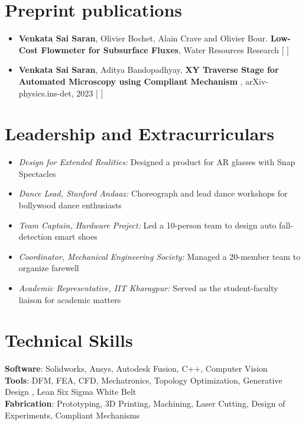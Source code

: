 \documentclass[a4paper,11pt]{article}
\begin{document}
\section{Preprint publications}
    \begin{itemize}[itemsep=-1pt, parsep=3pt]
        \item\small \textbf{Venkata Sai Saran}, Olivier Bochet, Alain Crave and Olivier Bour. \textbf{Low-Cost Flowmeter for Subsurface Fluxes}, Water Resources Research [ \href{https://drive.google.com/file/d/1GCLjv1otmMi0FopOgjguIMfjyTxVNbEb/view?usp=share_link}{\color{blue}{Draft}}]

        \item \textbf{Venkata Sai Saran}, Aditya Bandopadhyay, \textbf{XY Traverse Stage for Automated Microscopy using Compliant Mechanism }, arXiv-physics.ins-det, 2023 [ \href{http://arxiv.org/abs/2311.11022}{\color{blue}{Preprint}}]
    \end{itemize}
    
\section{Leadership and Extracurriculars}
    \begin{itemize}[itemsep=-5pt, parsep=3pt]
        \item \textit{Design for Extended Realities:} Designed a product for AR glasses with Snap Spectacles
        
        \item \textit{Dance Lead, Stanford Andaaz:} Choreograph and lead dance workshops for bollywood dance enthusiasts

        \item \textit{Team Captain, Hardware Project:} Led a 10-person team to design auto fall-detection smart shoes

        \item \textit{Coordinator, Mechanical Engineering Society:} Managed a 20-member team to organize farewell

        \item \textit{Academic Representative, IIT Kharagpur:} Served as the student-faculty liaison for academic matters
    \end{itemize}
 \vspace{-16pt}
\section{Technical Skills}
 \begin{itemize}[leftmargin=0.15in, label={}]
    \small{\item{
     \textbf{Software}{: Solidworks, Ansys, Autodesk Fusion, C++, Computer Vision}   \\ \textbf{Tools}{: DFM, FEA, CFD, Mechatronics, Topology Optimization, Generative Design , Lean Six Sigma White Belt} \\
     \textbf{Fabrication}{: Prototyping, 3D Printing, Machining, Laser Cutting, Design of Experiments, Compliant Mechanisms} \\
    }}
 \end{itemize}
 \vspace{-16pt}
\end{document}
